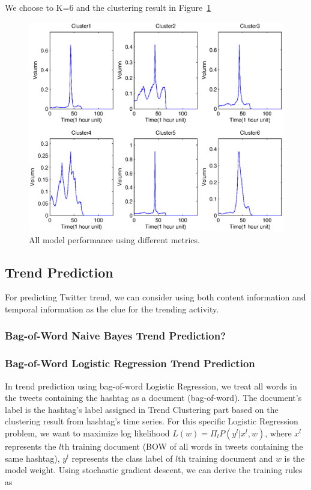 \documentclass{article}
\begin{document}
We choose to K=6 and the clustering result in Figure~\ref{six-cluster}

\begin{figure}[ht]
\vskip 0.2in
\begin{center}
\centerline{\includegraphics[width=\columnwidth]{sixClusters}}
\caption{All model performance using different metrics.}
\label{six-cluster}
\end{center}
\vskip -0.2in
\end{figure} 

\subsection{Trend Prediction}

For predicting Twitter trend, we can consider using both content information and temporal information as the clue for the trending activity.   

\subsubsection{Bag-of-Word Naive Bayes Trend Prediction?}

\subsubsection{Bag-of-Word Logistic Regression Trend Prediction}

In trend prediction using bag-of-word Logistic Regression, we treat all words in the tweets containing the hashtag as a document (bag-of-word). The document's label is the hashtag's label assigned in Trend Clustering part based on the clustering result from hashtag's time series. For this specific Logistic Regression problem, we want to maximize log likelihood $L(w)=\Pi_lP(y^l|x^l,w)$, where $x^l$ represents the $l$th training document (BOW of all words in tweets containing the same hashtag), $y^l$ represents the class label of $l$th training document and $w$ is the model weight. Using stochastic gradient descent, we can derive the training rules as 
\end{document}
